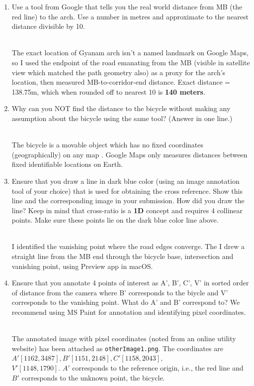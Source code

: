 \begin{enumerate}
\item Use a tool from Google that tells you the real world distance from MB (the red line) to the arch.  Use a number in metres and approximate to the nearest distance divisible by 10. 
\begin{studentSpace}
    \\The exact location of Gyanam arch isn't a named landmark on Google Maps, so I used the endpoint of the road emanating from the MB (visible in satellite view which matched the path geometry also) as a proxy for the arch's location, then measured MB-to-corridor-end distance. Exact distance = 138.75m, which when rounded off to nearest 10 is \textbf{140 meters}.
\end{studentSpace}

\item Why can you NOT find the distance to the bicycle without making any assumption about the bicycle using the same tool? (Answer in one line.)
\begin{studentSpace}
    \\The bicycle is a movable object which has no fixed coordinates (geographically) on any map . Google Maps only measures distances between fixed identifiable locations on Earth.
\end{studentSpace}

\item Ensure that you draw a line in dark blue color (using an image annotation tool of your choice) that is used for obtaining the cross reference.  Show this line and the corresponding image in your submission. How did you draw the line? Keep in mind that cross-ratio is a \textbf{1D} concept and requires 4 collinear points. Make sure these points lie on the dark blue color line above.
\begin{studentSpace}
    \\I identified the vanishing point where the road edges converge. The I drew a straight line from the MB end through the bicycle base, intersection and vanishing point, using Preview app in macOS.
\end{studentSpace}

\item Ensure that you annotate 4 points of interest as A', B', C', V'  in sorted order of distance from the camera where B' corresponds to the biycle and V' corresponds to the vanishing point.  What do A' and B' correspond to?
We recommend using MS Paint for annotation and identifying pixel coordinates.
\begin{studentSpace}
    \\The annotated image with pixel coordinates (noted from an online utility website) has been attached as \texttt{otherImage1.png}. The coordinates are $A'[1162,3487], B'[1151,2148],C'[1158,2043],$\\ $V'[1148,1790]$. $A'$ corresponds to the reference origin, i.e., the red line and $B'$ corresponds to the unknown point, the bicycle.
\end{studentSpace}


\end{enumerate}
